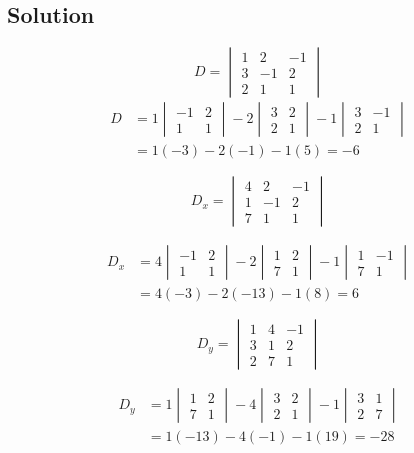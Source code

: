 \documentclass[12pt]{article}
\begin{document}
\subsection*{Solution}

\[
	D = \begin{vmatrix}
		1 & 2 & -1 \\
		3 & -1 & 2 \\
		2 & 1 & 1
	\end{vmatrix}
\]
\begin{align*}
	D &= 1\begin{vmatrix}
		-1 & 2 \\
		1 & 1
	\end{vmatrix} - 2\begin{vmatrix}
		3 & 2 \\
		2 & 1
	\end{vmatrix} - 1\begin{vmatrix}
		3 & -1 \\
		2 & 1
	\end{vmatrix} \\
	&= 1(-3) - 2(-1) - 1(5) = -6
\end{align*}

\[
	D_x = \begin{vmatrix}
		4 & 2 & -1 \\
		1 & -1 & 2 \\
		7 & 1 & 1
	\end{vmatrix}
\]

\begin{align*}
	D_x &= 4\begin{vmatrix}
		-1 & 2 \\
		1 & 1
	\end{vmatrix} - 2\begin{vmatrix}
		1 & 2 \\
		7 & 1
	\end{vmatrix} - 1\begin{vmatrix}
		1 & -1 \\
		7 & 1
	\end{vmatrix} \\
	&= 4(-3) - 2(-13) - 1(8) = 6
\end{align*}

\[
	D_y = \begin{vmatrix}
		1 & 4 & -1 \\
		3 & 1 & 2 \\
		2 & 7 & 1
	\end{vmatrix}
\]

\begin{align*}
	D_y &= 1\begin{vmatrix}
		1 & 2 \\
		7 & 1
	\end{vmatrix} - 4\begin{vmatrix}
		3 & 2 \\
		2 & 1
	\end{vmatrix} - 1\begin{vmatrix}
		3 & 1 \\
		2 & 7
	\end{vmatrix} \\
	&= 1(-13) - 4(-1) - 1(19) = -28
\end{align*}
\end{document}
